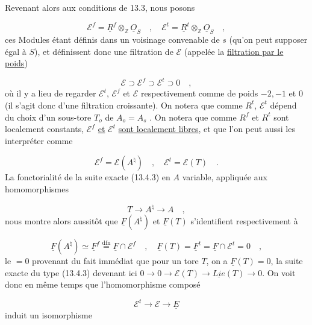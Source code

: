 Revenant alors aux conditions de 13.3, nous posons

\begin{equation}\tag{13.4.7}
\mathcal{E}^f = \underline{R}^f \otimes_{\mathbb{Z}} \underline{O}_S \quad , \quad \mathcal{E}^t = \underline{R}^t \otimes_{\mathbb{Z}} \underline{O}_S \quad ,
\end{equation}
ces Modules étant définis dans un voisinage convenable de $s$ (qu'on peut supposer égal à $S$), et définissent donc une filtration de $\mathcal{E}$ (appelée la \underline{filtration par le poids})

\begin{equation}\tag{13.4.8}
\mathcal{E} \supset \mathcal{E}^f \supset \mathcal{E}^t \supset 0 \quad ,
\end{equation}
où il y a lieu de regarder $\mathcal{E}^t$, $\mathcal{E}^f$ et $\mathcal{E}$ respectivement comme de poids $-2,-1$ et $0$ (il s'agit donc d'une filtration croissante). On notera que comme $R^t$, $\mathcal{E}^t$ dépend du choix d'un sous-tore $T_o$ de $A_o = A_s$ . On notera que comme $R^f$ et $R^t$ sont localement constants, $\mathcal{E}^f$ \underline{et} $\mathcal{E}^t$ \underline{sont localement libres}, et que l'on peut aussi les interpréter comme

\begin{equation}\tag{13.4.9}
\mathcal{E}^f = \mathcal{E}(A^\natural) \quad , \quad \mathcal{E}^t = \mathcal{E}(T) \quad .
\end{equation}
La fonctorialité de la suite exacte (13.4.3) en $A$ variable, appliquée aux homomorphismes

\begin{equation*}
T \longrightarrow A^\natural \longrightarrow A \quad ,
\end{equation*}
nous montre alors aussitôt que $\underline{F}(A^\natural)$ et $\underline{F}(T)$ s'identifient respectivement à

\begin{equation}\tag{13.4.10}
\underline{F}(A^\natural) \simeq \underline{F}^f \stackrel{\mathrm{dfn}}{=} \underline{F} \cap \mathcal{E}^f \quad , \quad \underline{F}(T) = \underline{F}^t = \underline{F} \cap \mathcal{E}^t = 0 \quad ,
\end{equation}
le $=0$ provenant du fait immédiat que pour un tore $T$, on a $\underline{F}(T) = 0$, la suite exacte du type (13.4.3) devenant ici $0 \to 0 \to \mathcal{E}(T) \to \underline{Lie}(T) \to 0$. On voit donc en même temps que l'homomorphisme composé

\begin{equation*}
\mathcal{E}^t \longrightarrow \mathcal{E} \longrightarrow \underline{E}
\end{equation*}
induit un isomorphisme


